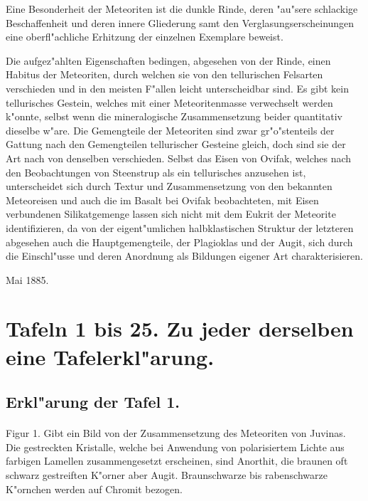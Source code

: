 \documentclass[a4paper, 11pt, oneside, polutonikogreek, german]{article}
\begin{document}
Eine Besonderheit der Meteoriten ist die dunkle Rinde, deren "au"sere schlackige Beschaffenheit und deren innere Gliederung samt den Verglasungserscheinungen eine oberfl"achliche Erhitzung der einzelnen Exemplare beweist.

Die aufgez"ahlten Eigenschaften bedingen, abgesehen von der Rinde, einen Habitus der Meteoriten, durch welchen sie von den tellurischen Felsarten verschieden und in den meisten F"allen leicht unterscheidbar sind. Es gibt kein tellurisches Gestein, welches mit einer Meteoritenmasse verwechselt werden k"onnte, selbst wenn die mineralogische Zusammensetzung beider quantitativ dieselbe w"are. Die Gemengteile der Meteoriten sind zwar gr"o"stenteils der Gattung nach den Gemengteilen tellurischer Gesteine gleich, doch sind sie der Art nach von denselben verschieden. Selbst das Eisen von Ovifak, welches nach den Beobachtungen von Steenstrup als ein tellurisches anzusehen ist, unterscheidet sich durch Textur und Zusammensetzung von den bekannten Meteoreisen und auch die im Basalt bei Ovifak beobachteten, mit Eisen verbundenen Silikatgemenge lassen sich nicht mit dem Eukrit der Meteorite identifizieren, da von der eigent"umlichen halbklastischen Struktur der letzteren abgesehen auch die Hauptgemengteile, der Plagioklas und der Augit, sich durch die Einschl"usse und deren Anordnung als Bildungen eigener Art charakterisieren.

Mai 1885.
\clearpage
\pagestyle{fancy}
\fancyhf{}
\cfoot{\frakfamily{\thepage}}
\section{Tafeln 1 bis 25. Zu jeder derselben eine Tafelerkl"arung.}
\subsection{Erkl"arung der Tafel 1.}
\paragraph{}
Figur 1. Gibt ein Bild von der Zusammensetzung des Meteoriten von Juvinas. Die gestreckten Kristalle, welche bei Anwendung von polarisiertem Lichte aus farbigen Lamellen zusammengesetzt erscheinen, sind Anorthit, die braunen oft schwarz gestreiften K"orner aber Augit. Braunschwarze bis rabenschwarze K"ornchen werden auf Chromit bezogen.
\end{document}
